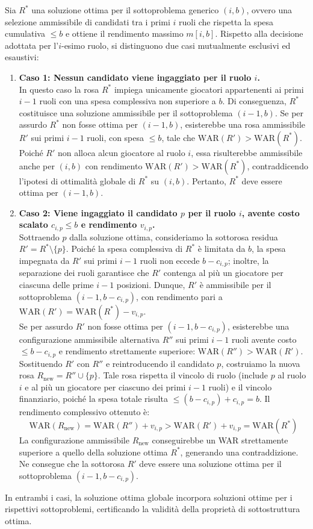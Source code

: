 Sia $R^*$ una soluzione ottima per il sottoproblema generico $(i, b)$, ovvero una selezione ammissibile di candidati tra i primi $i$ ruoli che rispetta la spesa cumulativa $\le b$ e ottiene il rendimento massimo $m[i, b]$. Rispetto alla decisione adottata per l'$i$-esimo ruolo, si distinguono due casi mutualmente esclusivi ed esaustivi:
\begin{enumerate}
	\item \textbf{Caso 1: Nessun candidato viene ingaggiato per il ruolo $i$.} \\
	      In questo caso la rosa $R^*$ impiega unicamente giocatori appartenenti ai primi $i-1$ ruoli con una spesa complessiva non superiore a $b$. Di conseguenza, $R^*$ costituisce una soluzione ammissibile per il sottoproblema $(i-1, b)$. Se per assurdo $R^*$ non fosse ottima per $(i-1, b)$, esisterebbe una rosa ammissibile $R'$ sui primi $i-1$ ruoli, con spesa $\le b$, tale che $\text{WAR}(R') > \text{WAR}(R^*)$. Poiché $R'$ non alloca alcun giocatore al ruolo $i$, essa risulterebbe ammissibile anche per $(i, b)$ con rendimento $\text{WAR}(R') > \text{WAR}(R^*)$, contraddicendo l'ipotesi di ottimalità globale di $R^*$ su $(i, b)$. Pertanto, $R^*$ deve essere ottima per $(i-1, b)$.

	\item \textbf{Caso 2: Viene ingaggiato il candidato $p$ per il ruolo $i$, avente costo scalato $c_{i, p} \le b$ e rendimento $v_{i, p}$.} \\
	      Sottraendo $p$ dalla soluzione ottima, consideriamo la sottorosa residua $R' = R^* \setminus \{p\}$. Poiché la spesa complessiva di $R^*$ è limitata da $b$, la spesa impegnata da $R'$ sui primi $i-1$ ruoli non eccede $b - c_{i, p}$; inoltre, la separazione dei ruoli garantisce che $R'$ contenga al più un giocatore per ciascuna delle prime $i-1$ posizioni. Dunque, $R'$ è ammissibile per il sottoproblema $(i-1, b - c_{i, p})$, con rendimento pari a $\text{WAR}(R') = \text{WAR}(R^*) - v_{i, p}$. \\
	      Se per assurdo $R'$ non fosse ottima per $(i-1, b - c_{i, p})$, esisterebbe una configurazione ammissibile alternativa $R''$ sui primi $i-1$ ruoli avente costo $\le b - c_{i, p}$ e rendimento strettamente superiore: $\text{WAR}(R'') > \text{WAR}(R')$.
	      Sostituendo $R'$ con $R''$ e reintroducendo il candidato $p$, costruiamo la nuova rosa $R_{\text{new}} = R'' \cup \{p\}$. Tale rosa rispetta il vincolo di ruolo (include $p$ al ruolo $i$ e al più un giocatore per ciascuno dei primi $i-1$ ruoli) e il vincolo finanziario, poiché la spesa totale risulta $\le (b - c_{i, p}) + c_{i, p} = b$. Il rendimento complessivo ottenuto è:
	      \[
		      \text{WAR}(R_{\text{new}}) = \text{WAR}(R'') + v_{i, p} > \text{WAR}(R') + v_{i, p} = \text{WAR}(R^*)
	      \]
	      La configurazione ammissibile $R_{\text{new}}$ conseguirebbe un WAR strettamente superiore a quello della soluzione ottima $R^*$, generando una contraddizione. Ne consegue che la sottorosa $R'$ deve essere una soluzione ottima per il sottoproblema $(i-1, b - c_{i, p})$.
\end{enumerate}
In entrambi i casi, la soluzione ottima globale incorpora soluzioni ottime per i rispettivi sottoproblemi, certificando la validità della proprietà di sottostruttura ottima.

